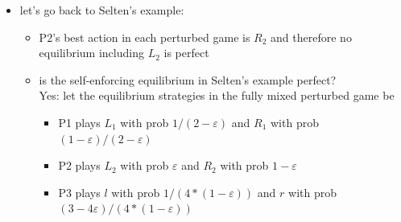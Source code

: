 \documentclass{beamer}    %
\theoremstyle{plain}
\theoremstyle{definition}
\begin{document}
{\begin{itemize}
\framebreak

\item let's go back to Selten's example: %
  \begin{itemize}
  \item P2's best action in each perturbed game is $R_2$ and therefore
    no equilibrium including $L_2$ is perfect
  \item is the self-enforcing equilibrium in Selten's example perfect?\\
    Yes: let the equilibrium strategies in the fully mixed perturbed
    game be
    \begin{itemize}
    \item P1 plays $L_1$ with prob $1/(2-\varepsilon )$ and $R_1$ with prob $(1-\varepsilon )/(2-\varepsilon )$
    \item P2 plays $L_2$ with prob $\varepsilon$ and $R_2$ with prob
      $1-\varepsilon$
    \item P3 plays $l$ with prob $1/(4*(1-\varepsilon ))$ and $r$ with prob $(3-4\varepsilon)/(4*(1-\varepsilon ))$
    \end{itemize}
  \end{itemize}
\end{itemize}

}
\end{document}
